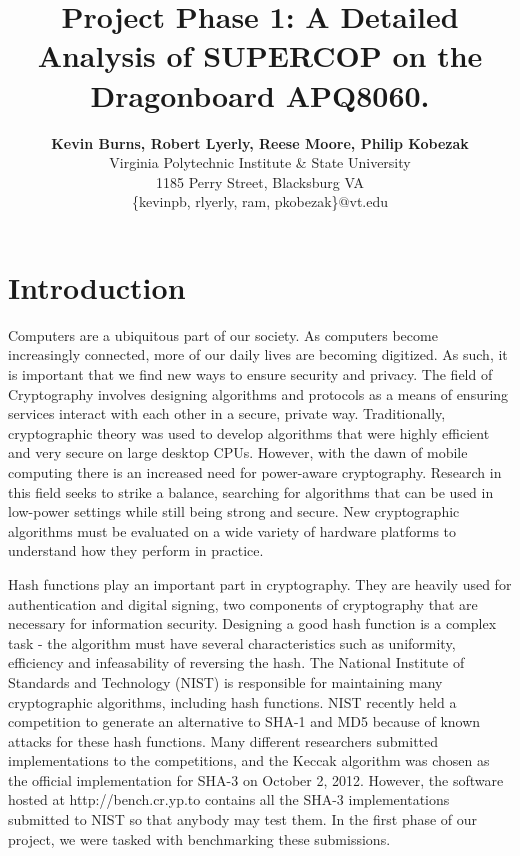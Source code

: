\documentclass[10pt,a4paper]{article}
\title{\LARGE
    Project Phase 1: A Detailed Analysis of SUPERCOP on the Dragonboard APQ8060.
}
\author{\large
{\bf Kevin Burns, Robert Lyerly, Reese Moore, Philip Kobezak}\\ 
Virginia Polytechnic Institute \& State University\\
1185 Perry Street, Blacksburg VA\\
\vspace{8mm}
\{kevinpb, rlyerly, ram, pkobezak\}$@$vt.edu\\
}
\date{}
\begin{document}
\maketitle


\section{Introduction}
Computers are a ubiquitous part of our society.  As computers become increasingly connected, more of our daily lives are becoming digitized.  As such, it is important that we find new ways to ensure security and privacy.  The field of Cryptography involves designing algorithms and protocols as a means of ensuring services interact with each other in a secure, private way.  Traditionally, cryptographic theory was used to develop algorithms that were highly efficient and very secure on large desktop CPUs.  However, with the dawn of mobile computing there is an increased need for power-aware cryptography.  Research in this field seeks to strike a balance, searching for algorithms that can be used in low-power settings while still being strong and secure.  New cryptographic algorithms must be evaluated on a wide variety of hardware platforms to understand how they perform in practice.

Hash functions play an important part in cryptography.  They are heavily used for authentication and digital signing, two components of cryptography that are necessary for information security.  Designing a good hash function is a complex task - the algorithm must have several characteristics such as uniformity, efficiency and infeasability of reversing the hash.  The National Institute of Standards and Technology (NIST) is responsible for maintaining many cryptographic algorithms, including hash functions.  NIST recently held a competition to generate an alternative to SHA-1 and MD5 because of known attacks for these hash functions.  Many different researchers submitted implementations to the competitions, and the Keccak algorithm was chosen as the official implementation for SHA-3 on October 2, 2012.  However, the software hosted at http://bench.cr.yp.to contains all the SHA-3 implementations submitted to NIST so that anybody may test them.  In the first phase of our project, we were tasked with benchmarking these submissions.
\end{document}
